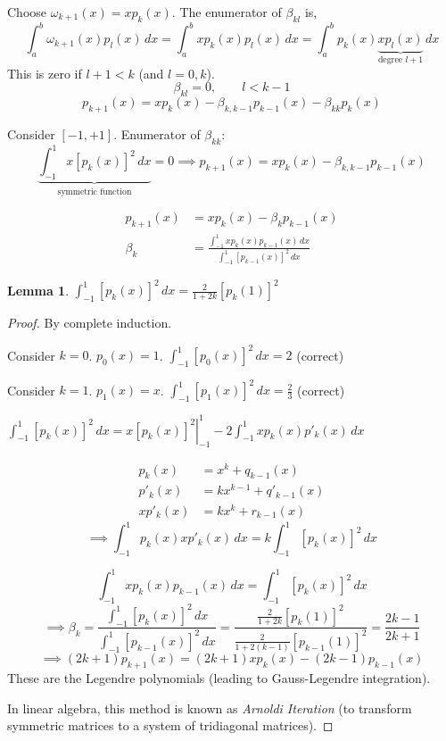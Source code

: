 \documentclass{article}
\newtheorem*{lemma}{Lemma}
\begin{document}
Choose $\omega_{k+1}(x) = x p_k(x)$.
The enumerator of $\beta_{kl}$ is,
\[ \int_a^b \omega_{k+1}(x) p_l(x) \, dx = \int_a^b x p_k(x) p_l(x) \, dx = \int_a^b p_k(x) \underbrace{x p_l(x)}_{\text{degree } l + 1} \, dx \]
This is zero if $l+1 < k$ (and $l = 0,k$).
\[ \beta_{kl} = 0, \qquad l < k-1 \]
\[ p_{k+1}(x) = x p_k(x) - \beta_{k,k-1} p_{k-1}(x) - \beta_{kk} p_k(x) \]

Consider $[-1,+1]$.
Enumerator of $\beta_{kk}$:
\[ \underbrace{\int_{-1}^1 x \left[p_k(x)\right]^2 \, dx}_{\text{symmetric function}} = 0 \implies p_{k+1}(x) = x p_k(x) - \beta_{k,k-1} p_{k-1}(x) \]

\begin{align*}
  p_{k+1}(x) &= x p_k(x) - \beta_k p_{k-1}(x) \\
  \beta_k &= \frac{\int_{-1}^1 x p_k(x) p_{k-1}(x) \, dx}{\int_{-1}^1 [p_{k-1}(x)]^2 \, dx}
\end{align*}

\begin{lemma}
  $\int_{-1}^1 \left[p_k(x)\right]^2 \, dx = \frac{2}{1 + 2k} \left[p_k(1)\right]^2$
\end{lemma}
\begin{proof}
  By complete induction.

  Consider $k=0$. $p_0(x) = 1$. $\int_{-1}^1 [p_0(x)]^2 \, dx = 2$ (correct)

  Consider $k=1$. $p_1(x) = x$. $\int_{-1}^1 [p_1(x)]^2 \, dx = \frac23$ (correct)

  $\int_{-1}^1 \left[p_k(x)\right]^2 \, dx = \left. x [p_k(x)]^2 \right|_{-1}^1 - 2 \int_{-1}^1 x p_k(x) p'_k(x) \, dx$

  \begin{align*}
    p_k(x) &= x^k + q_{k-1}(x) \\
    p'_k(x) &= kx^{k-1} + q'_{k-1}(x) \\
    xp'_k(x) &= kx^k + r_{k-1}(x)
  \end{align*}
  \[ \implies \int_{-1}^1 p_k(x) x p'_k(x) \, dx = k \int_{-1}^1 [p_k(x)]^2 \, dx \]

  \[ \int_{-1}^1 x p_k(x) p_{k-1}(x) \, dx = \int_{-1}^1 \left[p_k(x)\right]^2 \, dx \]
  \[ \implies \beta_k = \frac{\int_{-1}^1 \left[p_k(x)\right]^2 \, dx}{\int_{-1}^1 [p_{k-1}(x)]^2 \, dx}  = \frac{\frac{2}{1+2k} [p_k(1)]^2}{\frac{2}{1 + 2(k-1)} [p_{k-1}(1)]^2} = \frac{2k-1}{2k+1} \]
  \[ \implies (2k+1) p_{k+1}(x) = (2k + 1) x p_k(x) - (2k-1) p_{k-1}(x) \]
  These are the Legendre polynomials (leading to Gauss-Legendre integration).

  In linear algebra, this method is known as \emph{Arnoldi Iteration} (to transform symmetric matrices to a system of tridiagonal matrices).
\end{proof}
\end{document}
